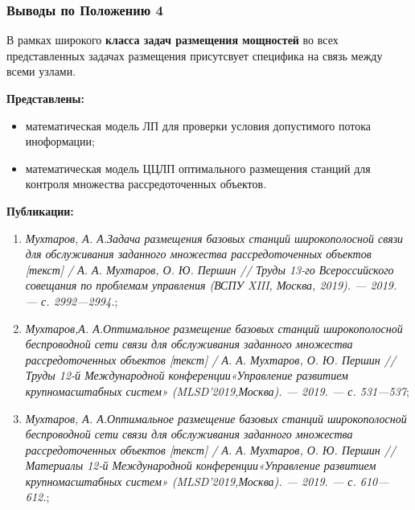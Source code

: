 \begin{frame}
    \frametitle{Выводы по Положению 4}
    \fontsize{8pt}{7.2}\selectfont

    В рамках широкого \textbf{класса задач размещения мощностей} во всех представленных задачах размещения присутсвует специфика на связь между всеми узлами. 
    \bigskip

    \textbf{Представлены:}
    \begin{itemize}
        \item математическая модель ЛП для проверки условия допустимого потока иноформации;
        \item математическая модель ЦЦЛП оптимального размещения станций для контроля множества рассредоточенных объектов.
    \end{itemize}

    \bigskip
    \textbf{Публикации:}
    \begin{minipage}[c]{1\linewidth}
        \fontsize{6pt}{7.2}\selectfont
        \begin{enumerate}
            \item \textit{Мухтаров, А. А.Задача размещения базовых станций широкопо­лосной связи для обслуживания заданного множества рассредото­ченных объектов [текст] / А. А. Мухтаров, О. Ю. Першин // Труды 13-го Всероссийского совещания по проблемам управления (ВСПУ XIII, Москва, 2019). — 2019. — с. 2992—2994.};
            
            \item \textit{Мухтаров,А. А.Оптимальное размещение базовых станций широ­кополосной беспроводной сети связи для обслуживания заданного множества рассредоточенных объектов [текст] / А. А. Мухта­ров, О. Ю. Першин // Труды 12-й Международной конференции«Управление развитием крупномасштабных систем» (MLSD’2019,Москва). — 2019. — с. 531—537};
            
            \item \textit{Мухтаров, А. А.Оптимальное размещение базовых станций широ­кополосной беспроводной сети связи для обслуживания заданного множества рассредоточенных объектов [текст] / А. А. Мухтаров, О. Ю. Першин // Материалы 12-й Международной конференции«Управление развитием крупномасштабных систем» (MLSD’2019,Москва). — 2019. — с. 610—612.};
            
        \end{enumerate}
    \end{minipage}

\end{frame}


